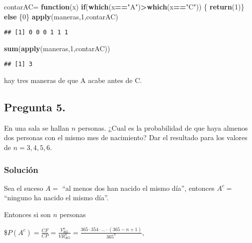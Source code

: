 \documentclass[
]{article}
\newenvironment{Shaded}{\begin{snugshade}}{\end{snugshade}}
\newcommand{\ControlFlowTok}[1]{\textcolor[rgb]{0.13,0.29,0.53}{\textbf{#1}}}
\newcommand{\DecValTok}[1]{\textcolor[rgb]{0.00,0.00,0.81}{#1}}
\newcommand{\KeywordTok}[1]{\textcolor[rgb]{0.13,0.29,0.53}{\textbf{#1}}}
\newcommand{\NormalTok}[1]{#1}
\newcommand{\OperatorTok}[1]{\textcolor[rgb]{0.81,0.36,0.00}{\textbf{#1}}}
\newcommand{\StringTok}[1]{\textcolor[rgb]{0.31,0.60,0.02}{#1}}
\begin{document}
\begin{Shaded}
\begin{Highlighting}[]
\NormalTok{contarAC=}\StringTok{ }\ControlFlowTok{function}\NormalTok{(x) }\ControlFlowTok{if}\NormalTok{(}\KeywordTok{which}\NormalTok{(x}\OperatorTok{==}\StringTok{"A"}\NormalTok{)}\OperatorTok{>}\KeywordTok{which}\NormalTok{(x}\OperatorTok{==}\StringTok{"C"}\NormalTok{)) \{ }\KeywordTok{return}\NormalTok{(}\DecValTok{1}\NormalTok{)\} }\ControlFlowTok{else}\NormalTok{ \{}\DecValTok{0}\NormalTok{\}}
\KeywordTok{apply}\NormalTok{(maneras,}\DecValTok{1}\NormalTok{,contarAC)}
\end{Highlighting}
\end{Shaded}

\begin{verbatim}
## [1] 0 0 0 1 1 1
\end{verbatim}

\begin{Shaded}
\begin{Highlighting}[]
\KeywordTok{sum}\NormalTok{(}\KeywordTok{apply}\NormalTok{(maneras,}\DecValTok{1}\NormalTok{,contarAC))}
\end{Highlighting}
\end{Shaded}

\begin{verbatim}
## [1] 3
\end{verbatim}

hay tres maneras de que A acabe antes de C.

\hypertarget{pregunta-5.}{%
\subsection{Pregunta 5.}\label{pregunta-5.}}

En una sala se hallan \(n\) personas. ¿Cual es la probabilidad de que
haya almenos dos personas con el mismo mes de nacimiento? Dar el
resultado para los valores de \(n=3,4,5,6\).

\hypertarget{soluciuxf3n-4}{%
\subsubsection{Solución}\label{soluciuxf3n-4}}

Sea el suceso \(A=\) ``al menos dos han nacido el mismo día'', entonces
\(A^c=\) ``ninguno ha nacido el mismo día''.

Entonces si son \(n\) personas

\$\(P(A^c)=\frac{CF}{CP}=\frac{V_{365}^n}{VR_{365}^n}=\frac{365\cdot 354\cdot \ldots\cdot (365-n+1) }{365^n},\)
\end{document}
